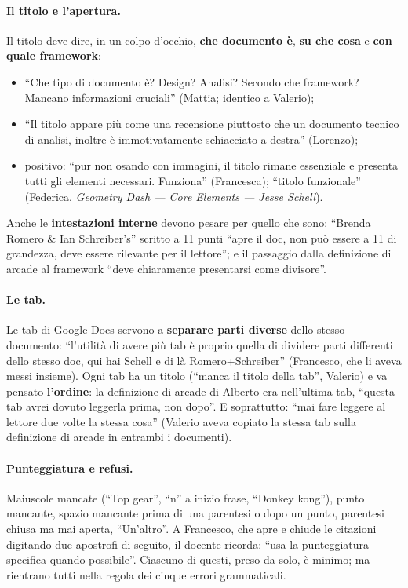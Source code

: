 \paragraph{Il titolo e l'apertura.} Il titolo deve dire, in un colpo
d'occhio, \textbf{che documento è}, \textbf{su che cosa} e \textbf{con quale
framework}:
\begin{itemize}
  \item ``Che tipo di documento è? Design? Analisi? Secondo che framework?
        Mancano informazioni cruciali'' (Mattia; identico a Valerio);
  \item ``Il titolo appare più come una recensione piuttosto che un documento
        tecnico di analisi, inoltre è immotivatamente schiacciato a destra''
        (Lorenzo);
  \item positivo: ``pur non osando con immagini, il titolo rimane essenziale e
        presenta tutti gli elementi necessari. Funziona'' (Francesca);
        ``titolo funzionale'' (Federica, \emph{Geometry Dash --- Core
        Elements --- Jesse Schell}).
\end{itemize}
Anche le \textbf{intestazioni interne} devono pesare per quello che sono:
``Brenda Romero \& Ian Schreiber's'' scritto a 11 punti ``apre il doc, non
può essere a 11 di grandezza, deve essere rilevante per il lettore''; e il
passaggio dalla definizione di arcade al framework ``deve chiaramente
presentarsi come divisore''.

\paragraph{Le tab.} Le tab di Google Docs servono a \textbf{separare parti
diverse} dello stesso documento: ``l'utilità di avere più tab è proprio quella
di dividere parti differenti dello stesso doc, qui hai Schell e di là
Romero+Schreiber'' (Francesco, che li aveva messi insieme). Ogni tab ha un
titolo (``manca il titolo della tab'', Valerio) e va pensato
\textbf{l'ordine}: la definizione di arcade di Alberto era nell'ultima tab,
``questa tab avrei dovuto leggerla prima, non dopo''. E soprattutto: ``mai
fare leggere al lettore due volte la stessa cosa'' (Valerio aveva copiato la
stessa tab sulla definizione di arcade in entrambi i documenti).

\paragraph{Punteggiatura e refusi.} Maiuscole mancate (``Top gear'', ``n'' a
inizio frase, ``Donkey kong''), punto mancante, spazio mancante prima di una
parentesi o dopo un punto, parentesi chiusa ma mai aperta, ``Un'altro''.
A Francesco, che apre e chiude le citazioni digitando due apostrofi di
seguito, il docente ricorda: ``usa la punteggiatura specifica quando
possibile''. Ciascuno di questi, preso da solo, è minimo; ma rientrano tutti
nella regola dei cinque errori grammaticali.

